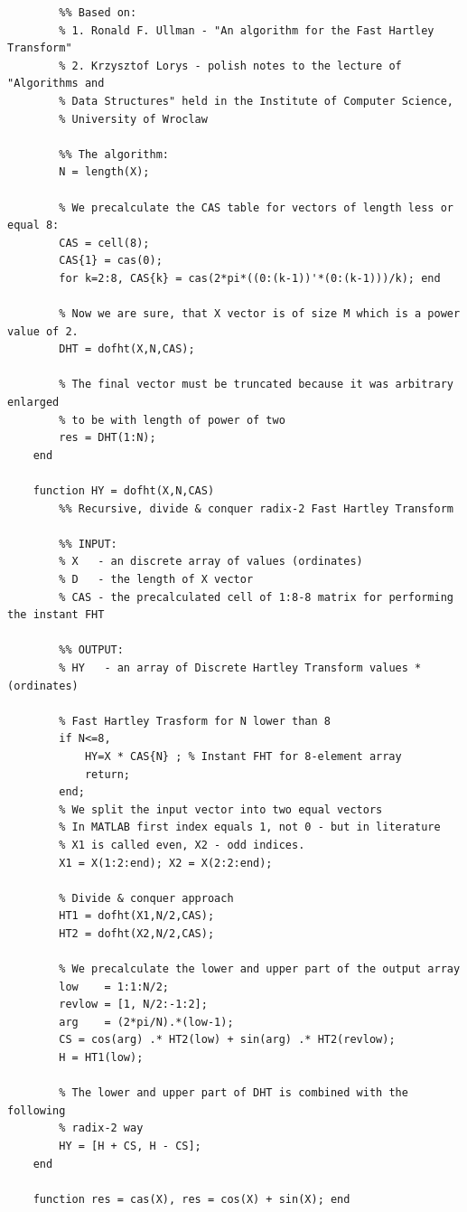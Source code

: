 \documentclass[12pt,twoside,a4paper]{article}
\numberwithin{equation}{subsection}
\numberwithin{figure}{subsection}
\begin{document}
\begin{lstlisting}
	    %% Based on:
	    % 1. Ronald F. Ullman - "An algorithm for the Fast Hartley Transform"
	    % 2. Krzysztof Lorys - polish notes to the lecture of "Algorithms and
	    % Data Structures" held in the Institute of Computer Science,
	    % University of Wroclaw
	  
	    %% The algorithm:
	    N = length(X);
	    
	    % We precalculate the CAS table for vectors of length less or equal 8:
	    CAS = cell(8);
	    CAS{1} = cas(0);
	    for k=2:8, CAS{k} = cas(2*pi*((0:(k-1))'*(0:(k-1)))/k); end
	    
	    % Now we are sure, that X vector is of size M which is a power value of 2.
	    DHT = dofht(X,N,CAS);
	    
	    % The final vector must be truncated because it was arbitrary enlarged
	    % to be with length of power of two
	    res = DHT(1:N);
	end
	
	function HY = dofht(X,N,CAS)
	    %% Recursive, divide & conquer radix-2 Fast Hartley Transform
	    
	    %% INPUT:
	    % X   - an discrete array of values (ordinates)
	    % D   - the length of X vector
	    % CAS - the precalculated cell of 1:8-8 matrix for performing the instant FHT
	    
	    %% OUTPUT:
	    % HY   - an array of Discrete Hartley Transform values * (ordinates)
	    
	    % Fast Hartley Trasform for N lower than 8
	    if N<=8, 
	        HY=X * CAS{N} ; % Instant FHT for 8-element array
	        return;
	    end;
	    % We split the input vector into two equal vectors
	    % In MATLAB first index equals 1, not 0 - but in literature 
	    % X1 is called even, X2 - odd indices.
	    X1 = X(1:2:end); X2 = X(2:2:end); 
	    
	    % Divide & conquer approach
	    HT1 = dofht(X1,N/2,CAS);
	    HT2 = dofht(X2,N/2,CAS);
	    
	    % We precalculate the lower and upper part of the output array 
	    low    = 1:1:N/2;
	    revlow = [1, N/2:-1:2];
	    arg    = (2*pi/N).*(low-1);
	    CS = cos(arg) .* HT2(low) + sin(arg) .* HT2(revlow);
	    H = HT1(low);
	    
	    % The lower and upper part of DHT is combined with the following
	    % radix-2 way
	    HY = [H + CS, H - CS];
	end
	
	function res = cas(X), res = cos(X) + sin(X); end
\end{lstlisting}
\end{document}
